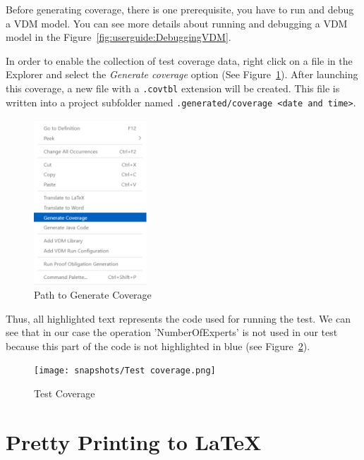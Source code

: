 \documentclass{overturerepchap}
\begin{document}
Before generating coverage, there is one prerequisite, you have to run and debug a VDM model. You can see more details about running and debugging a VDM model in the Figure~\ref{fig:userguide:DebuggingVDM}.

In order to enable the collection of test coverage data, right click on a file in the Explorer and select the \emph{Generate coverage} option (See Figure~\ref{fig:userguide:pathTestCoverage}). After
launching this coverage, a new file with a \texttt{.covtbl} extension will be created. This file is written into a project subfolder named
\texttt{.generated/coverage <date and time>}. 


\begin{figure}[htp]
\begin{center}
  \includegraphics[width=160px]{snapshots/Path to generate coverage.png}
  \caption[Path to generate coverage]{Path to Generate Coverage}
  \label{fig:userguide:pathTestCoverage}
\end{center}
\end{figure}

Thus, all highlighted text represents the code used for running the test. We can see that in our case the operation 'NumberOfExperts' is not used in our test because this part of the code is not highlighted in blue (see Figure~\ref{fig:userguide:testCoverage}). 

\begin{figure}[htp]
\begin{center}
  \texttt{[image: snapshots/Test coverage.png]}
  \caption[Test coverage]{Test Coverage}
  \label{fig:userguide:testCoverage}
\end{center}
\end{figure}

\chapter{Pretty Printing to \LaTeX}\label{sec:prettyprint}
\end{document}
